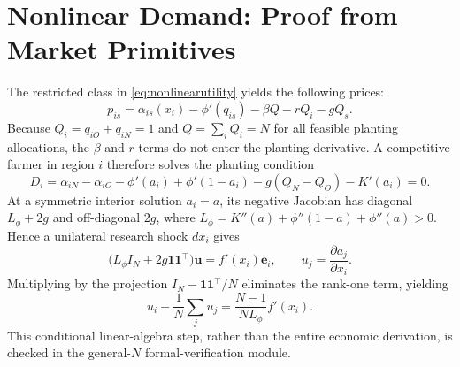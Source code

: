 \documentclass[USenglish]{article}
\begin{document}
\appendix
\section{Nonlinear Demand: Proof from Market Primitives}
\label{app:nonlinearproof}
The restricted class in \eqref{eq:nonlinearutility} yields the following prices:
\begin{equation}
 p_{is}=\alpha_{is}(x_i)-\phi'(q_{is})-\beta Q-rQ_i-gQ_s.
 \label{eq:appprice}
\end{equation}
Because $Q_i=q_{iO}+q_{iN}=1$ and $Q=\sum_i Q_i=N$ for all feasible planting allocations, the $\beta$ and $r$ terms do not enter the planting derivative. A competitive farmer in region $i$ therefore solves the planting condition
\begin{equation}
D_i=\alpha_{iN}-\alpha_{iO}
 -\phi'(a_i)+\phi'(1-a_i)
 -g(Q_N-Q_O)-K'(a_i)=0.
\label{eq:appD}
\end{equation}
At a symmetric interior solution $a_i=a$, its negative Jacobian has diagonal $L_\phi+2g$ and off-diagonal $2g$, where $L_\phi=K''(a)+\phi''(1-a)+\phi''(a)>0$. Hence a unilateral research shock $dx_i$ gives
\begin{equation}
 \big(L_\phi I_N+2g\mathbf1\mathbf1^\top\big)\mathbf u
 =f'(x_i)\mathbf e_i,\qquad
 u_j=\frac{\partial a_j}{\partial x_i}.
 \label{eq:appJ}
\end{equation}
Multiplying by the projection $I_N-\mathbf1\mathbf1^\top/N$ eliminates the rank-one term, yielding
\begin{equation}
u_i-\frac1N\sum_j u_j
=\frac{N-1}{NL_\phi}f'(x_i).
\label{eq:appcontrast}
\end{equation}
This conditional linear-algebra step, rather than the entire economic derivation, is checked in the general-$N$ formal-verification module.
\end{document}
